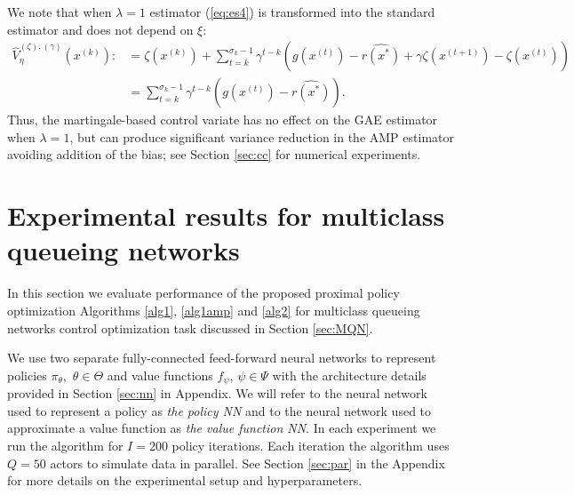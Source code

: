 \documentclass[11pt]{article}
\theoremstyle{definition}
\numberwithin{equation}{section}
\begin{document}
We note that when $\lambda=1$ estimator (\ref{eq:es4}) is transformed into  the standard estimator and does not depend on $\xi$:
\begin{align*}%
\hat V_\eta^{(\zeta), (\gamma)} (x^{(k)}):&= \zeta(x^{(k)}) \nonumber
 +  \sum\limits_{t=k}^{\sigma_k-1} \gamma^{t-k} \left(g(x^{(t) }) -\widehat{ r(x^*)}  +  \gamma \zeta(x^{(t+1)}) -\zeta(x^{(t)})  \right) \\
 &=\sum\limits_{t=k}^{\sigma_k-1}\gamma^{t-k} \left(g(x^{(t)})-\widehat{ r(x^*)}\right) .
\end{align*}
 Thus, the martingale-based control variate has no effect on the
  GAE estimator when $\lambda=1$, but can produce significant variance reduction in the AMP estimator avoiding addition of the bias; see Section \ref{sec:cc} for numerical experiments.






\section{Experimental results for multiclass queueing networks}\label{sec:experiments}
In this section we evaluate performance of the proposed proximal policy optimization Algorithms \ref{alg1},  \ref{alg1amp} and \ref{alg2} for multiclass queueing networks control optimization task discussed in Section \ref{sec:MQN}.




We use two separate fully-connected feed-forward neural networks to represent  policies $\pi_\theta,$ $\theta\in \Theta$ and value functions $f_\psi$, $\psi\in \Psi$ with the architecture details provided in Section \ref{sec:nn} in Appendix.  We will refer to the neural network used to represent a policy as \textit{the  policy NN} and to  the neural network used to approximate a value function as \textit{the value function NN}. In each experiment we run the algorithm for $I=200$ policy iterations. Each iteration the algorithm uses $Q=50$ actors to simulate data in parallel.    See Section \ref{sec:par} in the
Appendix for more details on the experimental setup and hyperparameters.
\end{document}
